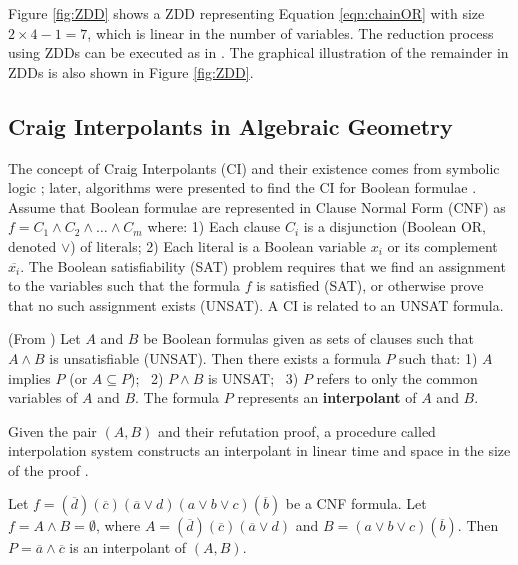 Figure \ref{fig:ZDD} shows a ZDD representing 
Equation \ref{eqn:chainOR} with size $2\times4 -1 = 7$, which is linear in the number of variables.
The reduction process using ZDDs can be executed as in \cite{PolyBoRi}. The graphical illustration 
of the remainder in ZDDs is also shown in Figure \ref{fig:ZDD}. 

\subsection{Craig Interpolants in Algebraic Geometry}
The concept of Craig Interpolants (CI) and their existence comes from
symbolic logic \cite{craig-interpolate}; later, algorithms were
presented to find the CI for Boolean formulae
\cite{pudlak:ci} \cite{mcmillan2003interpolation}. Assume that Boolean
formulae are represented in Clause Normal Form (CNF) as 
$f = C_1 \wedge C_2 \wedge \dots \wedge C_m$ where: 1) Each clause
$C_i$ is a disjunction (Boolean OR, denoted $\vee$) of literals; 2)
Each literal is a Boolean variable $x_i$ or its complement
$\overline{x_i}$. 
The Boolean satisfiability (SAT) problem requires that we find an
assignment to the variables such that the formula $f$ is satisfied
(SAT), or otherwise prove that no such assignment exists (UNSAT). 
A CI is related to an UNSAT formula. 

\begin{Definition}
(From \cite{mcmillan2003interpolation}) Let $A$ and $B$ be Boolean
  formulas given as sets of clauses such that $A \wedge B$ is
  unsatisfiable (UNSAT). Then there exists a formula $P$ such that: 
1) $A$ implies $P$ (or $A \subseteq P$); ~2) $P \wedge B$ is UNSAT; ~3)
$P$ refers to only the common variables of $A$ and $B$. The formula
$P$ represents an {\bf interpolant} of $A$ and $B$. 

Given  the pair $(A, B)$ and their refutation proof, a procedure
called interpolation system constructs an interpolant in linear time
and space in the size of the proof \cite{mcmillan2003interpolation}
\cite{pudlak:ci}. 
\end{Definition}

\begin{Example}\label{ex1}
Let $f = (\overline{d})(\overline{c})(\overline{a}\vee d)(a
\vee b \vee c)(\overline{b})$ be a CNF formula. Let $f = A \wedge B =
\emptyset$, where $A = (\overline{d})(\overline{c})(\overline{a}\vee
d)$ and  $B = (a \vee b \vee c)(\overline{b})$. Then $P = \overline{a}
\wedge \overline{c}$ is an interpolant of $(A, B)$. 
\end{Example}

